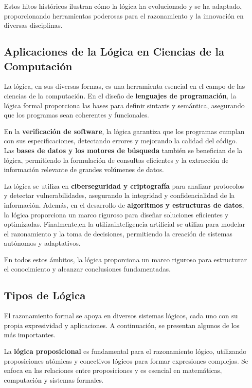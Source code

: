 Estos hitos históricos ilustran cómo la lógica ha evolucionado y se ha adaptado, proporcionando herramientas poderosas para el razonamiento y la innovación en diversas disciplinas.

\subsection{Aplicaciones de la Lógica en Ciencias de la Computación}

La lógica, en sus diversas formas, es una herramienta esencial en el campo de las ciencias de la computación. En el diseño de \textbf{lenguajes de programación}, la lógica formal proporciona las bases para definir sintaxis y semántica, asegurando que los programas sean coherentes y funcionales. 

En la \textbf{verificación de software}, la lógica garantiza que los programas cumplan con sus especificaciones, detectando errores y mejorando la calidad del código. Las \textbf{bases de datos y los motores de búsqueda} también se benefician de la lógica, permitiendo la formulación de consultas eficientes y la extracción de información relevante de grandes volúmenes de datos.

La lógica se utiliza en \textbf{ciberseguridad y criptografía} para analizar protocolos y detectar vulnerabilidades, asegurando la integridad y confidencialidad de la información. Además, en el desarrollo de \textbf{algoritmos y estructuras de datos}, la lógica proporciona un marco riguroso para diseñar soluciones eficientes y optimizadas. Finalmente,en la utilizainteligencia artificial se utiliza para modelar el razonamiento y la toma de decisiones, permitiendo la creación de sistemas autónomos y adaptativos. 

En todos estos ámbitos, la lógica proporciona un marco riguroso para estructurar el conocimiento y alcanzar conclusiones fundamentadas.



\subsection{Tipos de Lógica}

El razonamiento formal se apoya en diversos sistemas lógicos, cada uno con su propia expresividad y aplicaciones. A continuación, se presentan algunos de los más importantes.

La \textbf{lógica proposicional} es fundamental para el razonamiento lógico, utilizando proposiciones atómicas y conectivos lógicos para formar expresiones complejas. Se enfoca en las relaciones entre proposiciones y es esencial en matemáticas, computación y sistemas formales.

